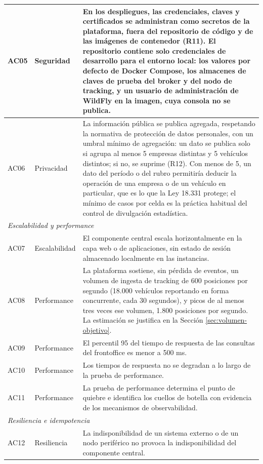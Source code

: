 \begin{longtable}{|p{1.3cm}|p{2.7cm}|p{11.5cm}|}
    \hline
    AC05 & Seguridad & En los despliegues, las credenciales, claves y certificados se administran como secretos de la plataforma, fuera del repositorio de código y de las imágenes de contenedor (R11). El repositorio contiene solo credenciales de desarrollo para el entorno local: los valores por defecto de Docker Compose, los almacenes de claves de prueba del broker y del nodo de tracking, y un usuario de administración de WildFly en la imagen, cuya consola no se publica. \\
    \hline
    AC06 & Privacidad & La información pública se publica agregada, respetando la normativa de protección de datos personales, con un umbral mínimo de agregación: un dato se publica solo si agrupa al menos 5 empresas distintas y 5 vehículos distintos; si no, se suprime (R12). Con menos de 5, un dato del período o del rubro permitiría deducir la operación de una empresa o de un vehículo en particular, que es lo que la Ley 18.331 protege; el mínimo de casos por celda es la práctica habitual del control de divulgación estadística. \\
    \hline
    \multicolumn{3}{|l|}{\textit{Escalabilidad y performance}} \\
    \hline
    AC07 & Escalabilidad & El componente central escala horizontalmente en la capa web o de aplicaciones, sin estado de sesión almacenado localmente en las instancias. \\
    \hline
    AC08 & Performance & La plataforma sostiene, sin pérdida de eventos, un volumen de ingesta de tracking de 600 posiciones por segundo (18.000 vehículos reportando en forma concurrente, cada 30 segundos), y picos de al menos tres veces ese volumen, 1.800 posiciones por segundo. La estimación se justifica en la Sección \ref{sec:volumen-objetivo}. \\
    \hline
    AC09 & Performance & El percentil 95 del tiempo de respuesta de las consultas del frontoffice es menor a 500 ms. \\
    \hline
    AC10 & Performance & Los tiempos de respuesta no se degradan a lo largo de la prueba de performance. \\
    \hline
    AC11 & Performance & La prueba de performance determina el punto de quiebre e identifica los cuellos de botella con evidencia de los mecanismos de observabilidad. \\
    \hline
    \multicolumn{3}{|l|}{\textit{Resiliencia e idempotencia}} \\
    \hline
    AC12 & Resiliencia & La indisponibilidad de un sistema externo o de un nodo periférico no provoca la indisponibilidad del componente central. \\

\end{longtable}
